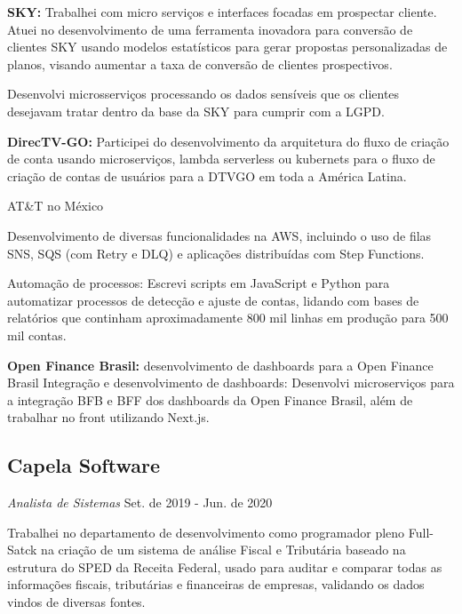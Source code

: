 \documentclass[a4paper,10pt]{article}
\begin{document}

\vspace{2mm} \textcolor{corSubSection}{\bfseries{SKY:}}
Trabalhei com micro serviços e interfaces focadas em prospectar cliente.
Atuei no desenvolvimento de uma ferramenta inovadora para conversão de clientes SKY
usando modelos estatísticos para gerar propostas personalizadas de planos,
visando aumentar a taxa de conversão de clientes prospectivos. 

Desenvolvi microsserviços processando os dados sensíveis que os clientes
desejavam tratar dentro da base da SKY para cumprir com a LGPD.

\vspace{2mm} \textcolor{corSubSection}{\bfseries{DirecTV-GO:}}
Participei do desenvolvimento da arquitetura do fluxo de criação de conta
usando microserviços, lambda serverless ou kubernets para o fluxo de criação de contas de usuários para a DTVGO em toda a América Latina.

AT\&T no México

Desenvolvimento de diversas funcionalidades na AWS,
incluindo o uso de filas SNS, SQS (com Retry e DLQ)
e aplicações distribuídas com Step Functions.


Automação de processos: Escrevi scripts em JavaScript e Python
para automatizar processos de detecção e ajuste de contas,
lidando com bases de relatórios que continham aproximadamente
800 mil linhas em produção para 500 mil contas.

\vspace{2mm} \textcolor{corSubSection}{\bfseries{Open Finance Brasil:}}
desenvolvimento de dashboards para a Open Finance Brasil
Integração e desenvolvimento de dashboards: Desenvolvi microserviços para a integração BFB e BFF dos dashboards da Open Finance Brasil, além de trabalhar no front utilizando Next.js.

\subsection*{Capela Software}
\textcolor{corSubSection}{\emph{Analista de Sistemas}}
\hfill\textcolor{corSubSection}{Set. de 2019 - Jun. de 2020}

Trabalhei no departamento de desenvolvimento como programador pleno Full-Satck na criação de um sistema de análise Fiscal e Tributária baseado na estrutura do SPED da Receita Federal, usado para auditar e comparar todas as informações fiscais, tributárias e financeiras de empresas, validando os dados vindos de diversas fontes.
\end{document}
